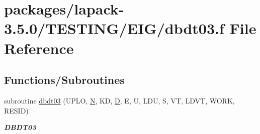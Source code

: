 \hypertarget{dbdt03_8f}{}\section{packages/lapack-\/3.5.0/\+T\+E\+S\+T\+I\+N\+G/\+E\+I\+G/dbdt03.f File Reference}
\label{dbdt03_8f}
\subsection*{Functions/\+Subroutines}
\begin{DoxyCompactItemize}
\item 
subroutine \hyperlink{group__double__eig_ga6c6578f36abb99e08a2b08611468074f}{dbdt03} (U\+P\+L\+O, \hyperlink{polmisc_8c_a0240ac851181b84ac374872dc5434ee4}{N}, K\+D, \hyperlink{odrpack_8h_a7dae6ea403d00f3687f24a874e67d139}{D}, E, U, L\+D\+U, S, V\+T, L\+D\+V\+T, W\+O\+R\+K, R\+E\+S\+I\+D)
\begin{DoxyCompactList}\small\item\em {\bfseries D\+B\+D\+T03} \end{DoxyCompactList}\end{DoxyCompactItemize}
